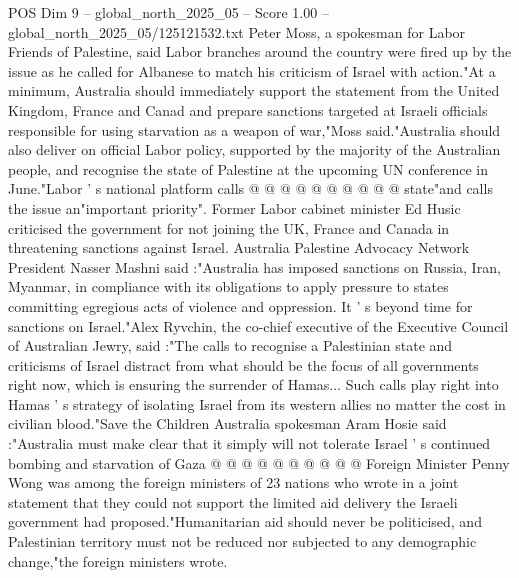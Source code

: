 \begin{textsample}{POS Dim 9 – global\_north\_2025\_05 – Score 1.00 – global\_north\_2025\_05/125121532.txt}
Peter Moss, a spokesman for Labor Friends of Palestine, said Labor branches around the country were fired up by the issue as he called for Albanese to match his criticism of Israel with action."At a minimum, Australia should immediately support the statement from the United Kingdom, France and Canad and prepare sanctions targeted at Israeli officials responsible for using starvation as a weapon of war,"Moss said."Australia should also deliver on official Labor policy, supported by the majority of the Australian people, and recognise the state of Palestine at the upcoming UN conference in June."Labor ' s national platform calls @ @ @ @ @ @ @ @ @ @ state"and calls the issue an"important priority".
Former Labor cabinet minister Ed Husic criticised the government for not joining the UK, France and Canada in threatening sanctions against Israel.
Australia Palestine Advocacy Network President Nasser Mashni said :"Australia has imposed sanctions on Russia, Iran, Myanmar, in compliance with its obligations to apply pressure to states committing egregious acts of violence and oppression.
It ' s beyond time for sanctions on Israel."Alex Ryvchin, the co-chief executive of the Executive Council of Australian Jewry, said :"The calls to recognise a Palestinian state and criticisms of Israel distract from what should be the focus of all governments right now, which is ensuring the surrender of Hamas...
Such calls play right into Hamas ' s strategy of isolating Israel from its western allies no matter the cost in civilian blood."Save the Children Australia spokesman Aram Hosie said :"Australia must make clear that it simply will not tolerate Israel ' s continued bombing and starvation of Gaza @ @ @ @ @ @ @ @ @ @ Foreign Minister Penny Wong was among the foreign ministers of 23 nations who wrote in a joint statement that they could not support the limited aid delivery the Israeli government had proposed."Humanitarian aid should never be politicised, and Palestinian territory must not be reduced nor subjected to any demographic change,"the foreign ministers wrote.

\end{textsample}
